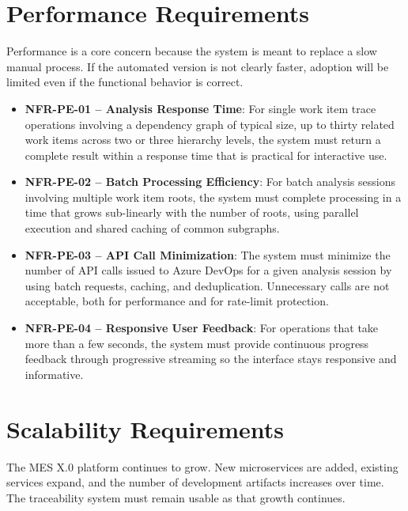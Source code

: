 \section{Performance Requirements}
\label{sec:req-performance}

Performance is a core concern because the system is meant to replace a slow
manual process. If the automated version is not clearly faster, adoption will be
limited even if the functional behavior is correct.

\begin{itemize}
  \item \textbf{NFR-PE-01 -- Analysis Response Time}: For single work item trace operations involving a dependency graph of typical size, up to thirty related work items across two or three hierarchy levels, the system must return a complete result within a response time that is practical for interactive use.

  \item \textbf{NFR-PE-02 -- Batch Processing Efficiency}: For batch analysis sessions involving multiple work item roots, the system must complete processing in a time that grows sub-linearly with the number of roots, using parallel execution and shared caching of common subgraphs.

  \item \textbf{NFR-PE-03 -- API Call Minimization}: The system must minimize the number of API calls issued to Azure DevOps for a given analysis session by using batch requests, caching, and deduplication. Unnecessary calls are not acceptable, both for performance and for rate-limit protection.

  \item \textbf{NFR-PE-04 -- Responsive User Feedback}: For operations that take more than a few seconds, the system must provide continuous progress feedback through progressive streaming so the interface stays responsive and informative.
\end{itemize}

\section{Scalability Requirements}
\label{sec:req-scalability}

The MES X.0 platform continues to grow. New microservices are added, existing
services expand, and the number of development artifacts increases over time.
The traceability system must remain usable as that growth continues.

